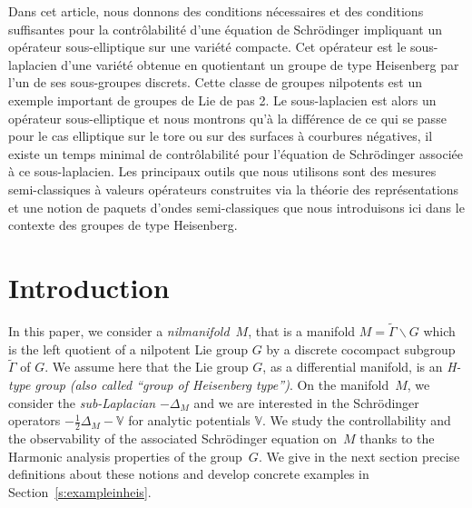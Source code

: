 \documentclass[JEP,XML,SOM,Unicode,published]{cedram}
\theoremstyle{plain}
\theoremstyle{definition}
\def\bbV{{\mathbb V}}
\begin{document}

\begin{altabstract}
Dans cet article, nous donnons des conditions nécessaires et des conditions suffisantes pour la contrôlabilité d’une équation de Schrödinger impliquant un opérateur sous-elliptique sur une variété compacte. Cet opérateur est le sous-laplacien d’une variété obtenue en quotientant un groupe de type Heisenberg par l’un de ses sous-groupes discrets. Cette classe de groupes nilpotents est un exemple important de groupes de Lie de pas 2. Le sous-laplacien est alors un opérateur sous-elliptique et nous montrons qu'à la différence de ce qui se passe pour le cas elliptique sur le tore ou sur des surfaces à courbures négatives, il existe un temps minimal de contrôlabilité pour l’équation de Schrödinger associée à ce sous-laplacien. Les principaux outils que nous utilisons sont des mesures semi-classiques à valeurs opérateurs construites via la théorie des représentations et une notion de paquets d’ondes semi-classiques que nous introduisons ici dans le contexte des groupes de type Heisenberg.\end{altabstract}

\maketitle
\vspace*{-\baselineskip}
\tableofcontents
\mainmatter

\section{Introduction} \label{s:intro}

In this paper, we consider a \emph{nilmanifold}~$M$, that is a
manifold $M=\widetilde{\Gamma}\backslash G$ which is the left quotient of a nilpotent Lie group $G$ by a discrete cocompact subgroup $\widetilde{\Gamma}$ of $G$. We assume here that the Lie group $G$, as a differential manifold, is an \emph{H-type group (also called ``group of Heisenberg type'')}. On the manifold~$M$, we consider the \emph{sub-Laplacian} $-\Delta_M$ and we are interested in the Schrödinger operators $-\frac12\Delta_M-\bbV$ for analytic potentials $\bbV$. We study the controllability and the observability of the associated Schrödinger equation on~$M$ thanks to the Harmonic analysis properties of the group~$G$.
We give in the next section precise definitions about these notions and develop concrete
examples in Section~\ref{s:exampleinheis}.
\end{document}
